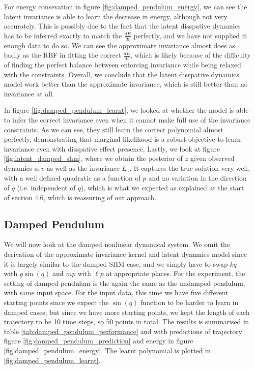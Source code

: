 \documentclass{statsmsc}
\begin{document}
For energy consevation in figure \ref{fig:damped_pendulum_energy}, we can see the latent invariance is able to learn the decrease in energy, although not very accurately.
This is possibly due to the fact that the latent disspative dynamics has to be inferred exactly to match the $\frac{dE}{dt}$ perfectly, and we have not supplied it enough data to do so.
We can see the approximate invariance almost does as badly as the RBF in fitting the correct $\frac{dE}{dt}$, which is likely because of the difficulty of finding the perfect balance between enforcing invariance while being relaxed with the constraints.
Overall, we conclude that the latent disspative dynamics model work better than the approximate invariance, which is still better than no invariance at all.

In figure \ref{fig:damped_pendulum_learnt}, we looked at whether the model is able to infer the correct invariance even when it cannot make full use of the invariance constraints.
As we can see, they still learn the correct polynomial almost perfectly, demonstrating that marginal likelihood is a robust objective to learn invariance even with disspative effect presence.
Lastly, we look at figure \ref{fig:latent_damped_shm}, where we obtain the posterior of $z$ given observed dynamics $a, v$ as well as the invariance $L_\gamma$.
It captures the true solution very well, with a well defined quadratic as a function of $p$ and no variation in the direction of $q$ (i.e. independent of $q$), which is what we expected as explained at the start of section 4.6, which is reassuring of our approach.


\subsection{Damped Pendulum}
We will now look at the damped nonlinear dynamical system.
We omit the derivation of the approximate invariance kernel and latent dyanmics model since it is largely similar to the damped SHM case, and we simply have to swap $kq$ with $g\sin(q)$ and $mp$ with $\ell p$ at appropriate places. 
For the experiment, the setting of damped pendulum is the again the same as the undamped pendulum, with same input space.
For the input data, this time we have five different starting points since we expect the $\sin(q)$ function to be harder to learn in damped cases; but since we have more starting points, we kept the length of each trajectory to be 10 time steps, so 50 points in total.
The results is summarised in table \ref{tab:damped_pendulum_performance} and with predictions of trajectory figure \ref{fig:damped_pendulum_prediction} and energy in figure \ref{fig:damped_pendulum_energy}.
The learnt polynomial is plotted in \ref{fig:damped_pendulum_learnt}.
\end{document}
